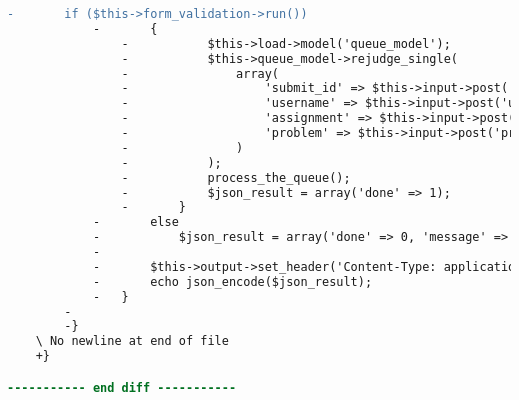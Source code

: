 \begin{lstlisting}[language=diff, caption=Perubahan pada kode Rejudge.php]
			-		if ($this->form_validation->run())
			-		{
				-			$this->load->model('queue_model');
				-			$this->queue_model->rejudge_single(
				-				array(
				-					'submit_id' => $this->input->post('submit_id'),
				-					'username' => $this->input->post('username'),
				-					'assignment' => $this->input->post('assignment'),
				-					'problem' => $this->input->post('problem'),
				-				)
				-			);
				-			process_the_queue();
				-			$json_result = array('done' => 1);
				-		}
			-		else
			-			$json_result = array('done' => 0, 'message' => 'Input Error');
			-
			-		$this->output->set_header('Content-Type: application/json; charset=utf-8');
			-		echo json_encode($json_result);
			-	}
		-
		-}
	\ No newline at end of file
	+}

----------- end diff -----------
\end{lstlisting}

